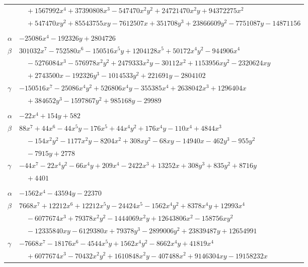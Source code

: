 \documentclass[11pt]{article}
\begin{document}
\begin{longtable}{@{}ll@{}}
 & $\quad +1567992x^{4}+37390808x^{3}-547470x^{2}y^{2}+24721470x^{2}y+94372275x^{2}$\\
 & $\quad +547470xy^{2}+85543755xy-7612507x+351708y^{3}+23866609y^{2}-7751087y-14871156$\\
\addlinespace[3pt]
\multicolumn{2}{@{}l}{$\{i,j\}=\{52,53\}$, $k_{ij}=2^{4}\cdot 3\cdot 13$}\\
$\alpha$ & $-25086x^{4}-192326y+2804726$\\
$\beta$ & $301032x^{7}-752580x^{6}-150516x^{5}y+1204128x^{5}+50172x^{4}y^{2}-944906x^{4}$\\
 & $\quad -5276084x^{3}-576978x^{2}y^{2}+2479333x^{2}y-30112x^{2}+1153956xy^{2}-2320624xy$\\
 & $\quad +2743500x-192326y^{3}-1014533y^{2}+221691y-2804102$\\
$\gamma$ & $-150516x^{7}-25086x^{4}y^{2}+526806x^{4}y-355385x^{4}+2638042x^{3}+1296404x$\\
 & $\quad +384652y^{3}-1597867y^{2}+985168y-29989$\\
\addlinespace[3pt]
\multicolumn{2}{@{}l}{$\{i,j\}=\{52,58\}$, $k_{ij}=2^{5}\cdot 3\cdot 5\cdot 7$}\\
$\alpha$ & $-22x^{4}+154y+582$\\
$\beta$ & $88x^{7}+44x^{6}-44x^{5}y-176x^{5}+44x^{4}y^{2}+176x^{4}y-110x^{4}+4844x^{3}$\\
 & $\quad -154x^{2}y^{2}-1177x^{2}y-8204x^{2}+308xy^{2}-68xy-14940x-462y^{3}-955y^{2}$\\
 & $\quad -7915y+2778$\\
$\gamma$ & $-44x^{7}-22x^{4}y^{2}-66x^{4}y+209x^{4}-2422x^{3}+13252x+308y^{3}+835y^{2}+8716y$\\
 & $\quad +4401$\\
\addlinespace[3pt]
\multicolumn{2}{@{}l}{$\{i,j\}=\{52,85\}$, $k_{ij}=2^{3}\cdot 3^{2}$}\\
$\alpha$ & $-1562x^{4}-43594y-22370$\\
$\beta$ & $7668x^{7}+12212x^{6}+12212x^{5}y-24424x^{5}-1562x^{4}y^{2}+8378x^{4}y+12993x^{4}$\\
 & $\quad -6077674x^{3}+79378x^{2}y^{2}-1444069x^{2}y+12643806x^{2}-158756xy^{2}$\\
 & $\quad -12335840xy-6129380x+79378y^{3}-2899006y^{2}+23839487y+12654991$\\
$\gamma$ & $-7668x^{7}-18176x^{6}-4544x^{5}y+1562x^{4}y^{2}-8662x^{4}y+41819x^{4}$\\
 & $\quad +6077674x^{3}-70432x^{2}y^{2}+1610848x^{2}y-407488x^{2}+9146304xy-19158232x$\\

\end{longtable}
\end{document}
